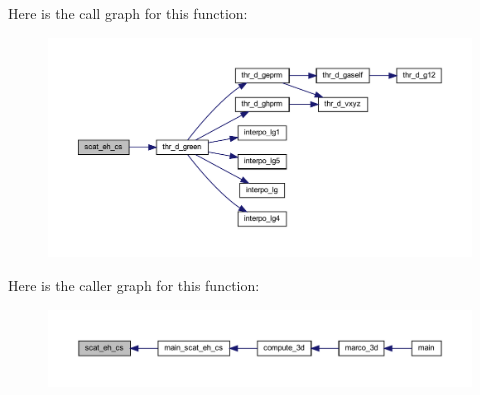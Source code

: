 Here is the call graph for this function\+:
\nopagebreak
\begin{figure}[H]
\begin{center}
\leavevmode
\includegraphics[width=350pt]{Marco_8f90_ab114795afedfc64f5732cc167cf0861a_cgraph}
\end{center}
\end{figure}
Here is the caller graph for this function\+:
\nopagebreak
\begin{figure}[H]
\begin{center}
\leavevmode
\includegraphics[width=350pt]{Marco_8f90_ab114795afedfc64f5732cc167cf0861a_icgraph}
\end{center}
\end{figure}
\mbox{\label{Marco_8f90_a343a057778b6701b550f9b257d626981}} 
